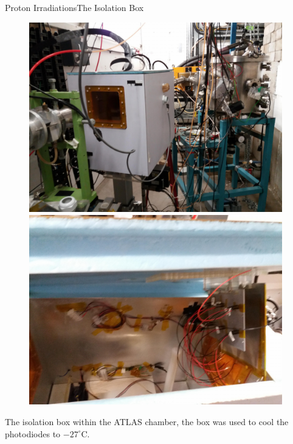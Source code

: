 \documentclass{beamer}
\begin{document}
    \begin{frame}{Proton Irradiations}{The Isolation Box}
        \begin{figure}
            \begin{minipage}[b]{0.5\linewidth}
            \centering
            \includegraphics[width = 0.98\textwidth]{ATLAS_chamber.jpg}
        \end{minipage}%
        \begin{minipage}[b]{0.5\linewidth}
            \centering
            \includegraphics[width = 0.98\textwidth]{Isolation_box.jpg}
        \end{minipage}
        \end{figure}
        The isolation box within the ATLAS chamber, the box was used to cool the photodiodes to $-27^{\circ}$C.
    \end{frame}
    
\end{document}
